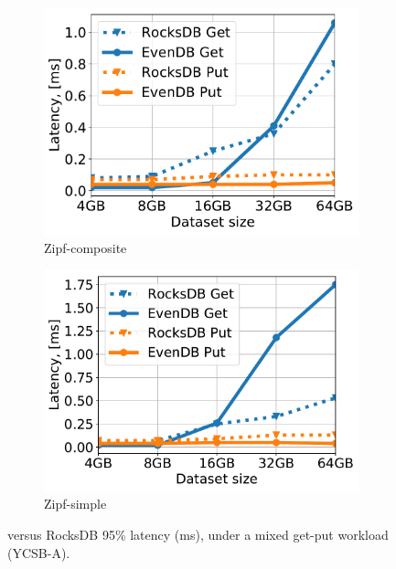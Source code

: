 \begin{figure}[htb]
\centering
\begin{subfigure}{0.49\linewidth}
\includegraphics[width=\textwidth]{figs/tail_flurry_line.pdf}
\caption{Zipf-composite}
\label{fig:tail_latency:co}
\end{subfigure}
\begin{subfigure}{0.49\linewidth}
\includegraphics[width=\textwidth]{figs/tail_zipf_line.pdf}
\caption{Zipf-simple}
\label{fig:tail_latency:si}
\end{subfigure}
\caption{{\sys\/ versus RocksDB 95\% latency (ms), under a mixed get-put workload (YCSB-A).}}
\label{fig:tail_latency}
\end{figure}

